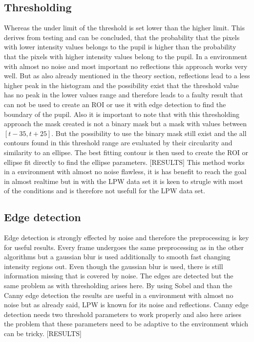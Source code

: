 \subsection{Thresholding}
Whereas the under limit of the threshold is set lower than the higher limit. This derives from testing and can be concluded, that the probability that the pixels with lower intensity values belongs to the pupil is higher than the probability that the pixels with higher intensity values belong to the pupil. In a environment with almost no noise and most important no reflections this approach works very well. But as also already mentioned in the theory section, reflections lead to a less higher peak in the histogram and the possibility exist that the threshold value has no peak in the lower values range and therefore leads to a faulty result that can not be used to create an ROI or use it with edge detection to find the boundary of the pupil. Also it is important to note that with this thresholding approach the mask created is not a binary mask but a mask with values between $[t-35, t+25]$. But the possibility to use the binary mask still exist and the all contours found in this threshold range are evaluated by their circularity and similarity to an ellipse. The best fitting contour is then used to create the ROI or ellipse fit directly to find the ellipse parameters. 
[RESULTS]
This method works in a environment with almost no noise flawless, it is has benefit to reach the goal in almost realtime but in with the LPW data set it is keen to strugle with most of the conditions and is therefore not usefull for the LPW data set.

\subsection{Edge detection}
Edge detection is strongly effected by noise and therefore the preprocessing is key for useful results. Every frame undergoes the same preprocessing as in the other algorithms but a gaussian blur is used additionally to smooth fast changing intensity regions out.  Even though the gaussian blur is used, there is still information missing that is covered by noise. The edges are detected but the same problem as with thresholding arises here. By using Sobel and than the Canny edge detection the results are useful in a environment with almost no noise but as already said, LPW is known for its noise and reflections. Canny edge detection needs two threshold parameters to work properly and also here arises the problem that these parameters need to be adaptive to the environment which can be tricky. 
[RESULTS]

